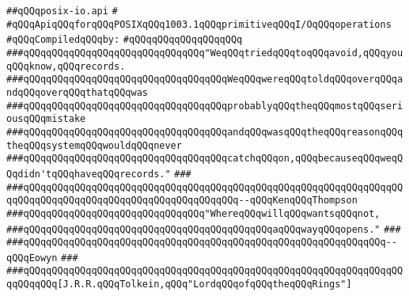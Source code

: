 \label{src/lib/std/src/psx/posix-io.api}
\verb|##qQQqposix-io.api|\newline
\verb|#|\newline
\verb|#qQQqApiqQQqforqQQqPOSIXqQQq1003.1qQQqprimitiveqQQqI/OqQQqoperations|\newline
\newline
\verb|#qQQqCompiledqQQqby:|\newline
\verb|#qQQqqQQqqQQqqQQqqQQq|\newline
\newline
\newline
\newline
\newline
\verb|###qQQqqQQqqQQqqQQqqQQqqQQqqQQqqQQq"WeqQQqtriedqQQqtoqQQqavoid,qQQqyouqQQqknow,qQQqrecords.|\newline
\verb|###qQQqqQQqqQQqqQQqqQQqqQQqqQQqqQQqqQQqWeqQQqwereqQQqtoldqQQqoverqQQqandqQQqoverqQQqthatqQQqwas|\newline
\verb|###qQQqqQQqqQQqqQQqqQQqqQQqqQQqqQQqqQQqprobablyqQQqtheqQQqmostqQQqseriousqQQqmistake|\newline
\verb|###qQQqqQQqqQQqqQQqqQQqqQQqqQQqqQQqqQQqandqQQqwasqQQqtheqQQqreasonqQQqtheqQQqsystemqQQqwouldqQQqnever|\newline
\verb|###qQQqqQQqqQQqqQQqqQQqqQQqqQQqqQQqqQQqcatchqQQqon,qQQqbecauseqQQqweqQQqdidn'tqQQqhaveqQQqrecords."|\newline
\verb|###|\newline
\verb|###qQQqqQQqqQQqqQQqqQQqqQQqqQQqqQQqqQQqqQQqqQQqqQQqqQQqqQQqqQQqqQQqqQQqqQQqqQQqqQQqqQQqqQQqqQQqqQQqqQQqqQQqqQQq--qQQqKenqQQqThompson|\newline
\newline
\newline
\newline
\verb|###qQQqqQQqqQQqqQQqqQQqqQQqqQQqqQQq"WhereqQQqwillqQQqwantsqQQqnot,|\newline
\verb|###qQQqqQQqqQQqqQQqqQQqqQQqqQQqqQQqqQQqqQQqqQQqaqQQqwayqQQqopens."|\newline
\verb|###|\newline
\verb|###qQQqqQQqqQQqqQQqqQQqqQQqqQQqqQQqqQQqqQQqqQQqqQQqqQQqqQQqqQQqqQQq--qQQqEowyn|\newline
\verb|###|\newline
\verb|###qQQqqQQqqQQqqQQqqQQqqQQqqQQqqQQqqQQqqQQqqQQqqQQqqQQqqQQqqQQqqQQqqQQqqQQqqQQq[J.R.R.qQQqTolkein,qQQq"LordqQQqofqQQqtheqQQqRings"]|\newline
